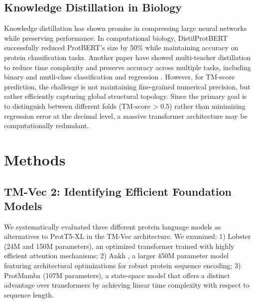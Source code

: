 \documentclass[runningheads]{llncs}
\begin{document}
\subsection{Knowledge Distillation in Biology}

Knowledge distillation \cite{hinton2015distilling} has shown promise in compressing large neural networks while preserving performance. In computational biology, DistilProtBERT \cite{geffen2022distilprotbert} successfully reduced ProtBERT's size by 50\% while maintaining accuracy on protein classification tasks. Another paper have showed multi-teacher distillation to reduce time complexity and preserve accuracy across multiple tasks, including binary and mutli-class classification and regression \cite{shang2024accurate}. However, for TM-score prediction, the challenge is not maintaining fine-grained numerical precision, but rather efficiently capturing global structural topology. Since the primary goal is to distinguish between different folds (TM-score > 0.5) rather than minimizing regression error at the decimal level, a massive transformer architecture may be computationally redundant.


\section{Methods}

\subsection{TM-Vec 2: Identifying Efficient Foundation Models}



We systematically evaluated three different protein language models as alternatives to ProtT5-XL in the TM-Vec architecture. We examined: 1) Lobster \cite{frey2024cramming} (24M and 150M parameters), an optimized transformer trained with highly efficient attention mechanisms; 2) Ankh    \cite{elnaggar2023ankh}, a larger 450M parameter model featuring architectural optimizations for robust protein sequence encoding; 3) ProtMamba \cite{sgarbossa2025protmamba} (107M parameters), a state-space model that offers a distinct advantage over transformers by achieving linear time complexity with respect to sequence length. 
\end{document}
